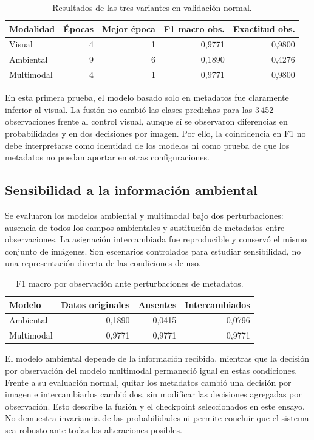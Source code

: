 \documentclass[11pt,a4paper]{article}
\begin{document}
\begin{table}[H]
\centering
\caption{Resultados de las tres variantes en validación normal.}
\label{tab:s8}
\begin{tabular}{lrrrr}
\toprule
Modalidad & Épocas & Mejor época & F1 macro obs. & Exactitud obs. \\
\midrule
Visual & 4 & 1 & 0,9771 & 0,9800 \\
Ambiental & 9 & 6 & 0,1890 & 0,4276 \\
Multimodal & 4 & 1 & 0,9771 & 0,9800 \\
\bottomrule
\end{tabular}
\end{table}

En esta primera prueba, el modelo basado solo en metadatos fue claramente
inferior al visual. La fusión no cambió las clases predichas para las
3\,452 observaciones frente al control visual, aunque sí se observaron
diferencias en probabilidades y en dos decisiones por imagen. Por ello,
la coincidencia en F1 no debe interpretarse como identidad de los modelos ni
como prueba de que los metadatos no puedan aportar en otras configuraciones.

\subsection{Sensibilidad a la información ambiental}
Se evaluaron los modelos ambiental y multimodal bajo dos perturbaciones:
ausencia de todos los campos ambientales y sustitución de metadatos entre
observaciones. La asignación intercambiada fue reproducible y conservó el
mismo conjunto de imágenes. Son escenarios controlados para estudiar
sensibilidad, no una representación directa de las condiciones de uso.

\begin{table}[H]
\centering
\caption{F1 macro por observación ante perturbaciones de metadatos.}
\label{tab:sensibilidad}
\begin{tabular}{lrrr}
\toprule
Modelo & Datos originales & Ausentes & Intercambiados \\
\midrule
Ambiental & 0,1890 & 0,0415 & 0,0796 \\
Multimodal & 0,9771 & 0,9771 & 0,9771 \\
\bottomrule
\end{tabular}
\end{table}

El modelo ambiental depende de la información recibida, mientras que la
decisión por observación del modelo multimodal permaneció igual en estas
condiciones. Frente a su evaluación normal, quitar los metadatos cambió una
decisión por imagen e intercambiarlos cambió dos, sin modificar las decisiones
agregadas por observación. Esto describe la fusión y el checkpoint seleccionados en este
ensayo. No demuestra invariancia de las probabilidades ni permite concluir
que el sistema sea robusto ante todas las alteraciones posibles.
\end{document}
